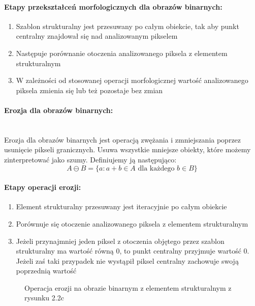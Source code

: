 \documentclass[a4paper,12pt,twoside,openany]{report}
\newcommand{\ImgPath}{.}
\begin{document}
\paragraph{Etapy przekształceń morfologicznych dla obrazów binarnych:}
\begin{enumerate}
	\item Szablon strukturalny jest przesuwany po całym obiekcie, tak aby punkt centralny znajdował się nad analizowanym pikselem
	\item Następuje porównanie otoczenia analizowanego piksela z elementem strukturalnym
	\item W zależności od stosowanej operacji morfologicznej wartość analizowanego piksela zmienia się lub też pozostaje bez zmian
\end{enumerate}

\paragraph{Erozja dla obrazów binarnych:}\mbox{} \\
\indent Erozja dla obrazów binarnych jest operacją zwężania i zmniejszania poprzez usunięcie pikseli granicznych. Usuwa wszystkie mniejsze obiekty, które możemy zinterpretować jako szumy. Definiujemy ją następująco:
\begin{equation}
	 A \ominus B = \{a \colon a + b \in A \mbox{ dla każdego } b \in B\} 
\end{equation}

\paragraph{Etapy operacji erozji:}
\begin{enumerate}
	\item Element strukturalny przesuwany jest iteracyjnie po całym obiekcie
	\item Porównuje się otoczenie analizowanego piksela z elementem strukturalnym
	\item  Jeżeli przynajmniej jeden piksel z otoczenia objętego przez szablon strukturalny ma wartość równą 0, to punkt centralny przyjmuje wartość 0. Jeżeli zaś taki przypadek nie wystąpił piksel centralny zachowuje swoją poprzednią wartość
\end{enumerate}

\begin{figure}[H]
	\centering
	\caption{Operacja erozji na obrazie binarnym z elementem strukturalnym z rysunku 2.2c}
\end{figure}
\end{document}
